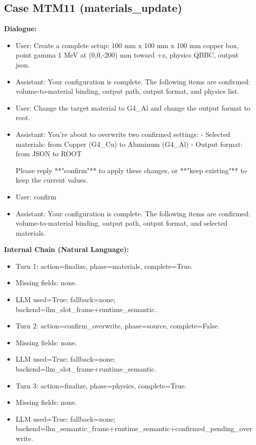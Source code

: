 \documentclass[11pt]{ctexart}
\begin{document}
\subsection{Case MTM11 (materials\_update)}
\textbf{Dialogue:}
\begin{itemize}
\item User: Create a complete setup: 100 mm x 100 mm x 100 mm copper box, point gamma 1 MeV at (0,0,-200) mm toward +z, physics QBBC, output json.
\item Assistant: Your configuration is complete. The following items are confirmed: volume-to-material binding, output path, output format, and physics list.
\item User: Change the target material to G4\_Al and change the output format to root.
\item Assistant: You're about to overwrite two confirmed settings:
- Selected materials: from Copper (G4\_Cu) to Aluminum (G4\_Al)
- Output format: from JSON to ROOT

Please reply **"confirm"** to apply these changes, or **"keep existing"** to keep the current values.
\item User: confirm
\item Assistant: Your configuration is complete. The following items are confirmed: volume-to-material binding, output path, output format, and selected materials.
\end{itemize}
\textbf{Internal Chain (Natural Language):}
\begin{itemize}
\item Turn 1: action=finalize, phase=materials, complete=True.
\item Missing fields: none.
\item LLM used=True; fallback=none; backend=llm\_slot\_frame+runtime\_semantic.
\item Turn 2: action=confirm\_overwrite, phase=source, complete=False.
\item Missing fields: none.
\item LLM used=True; fallback=none; backend=llm\_slot\_frame+runtime\_semantic.
\item Turn 3: action=finalize, phase=physics, complete=True.
\item Missing fields: none.
\item LLM used=True; fallback=none; backend=llm\_semantic\_frame+runtime\_semantic+confirmed\_pending\_overwrite.
\end{itemize}
\end{document}
